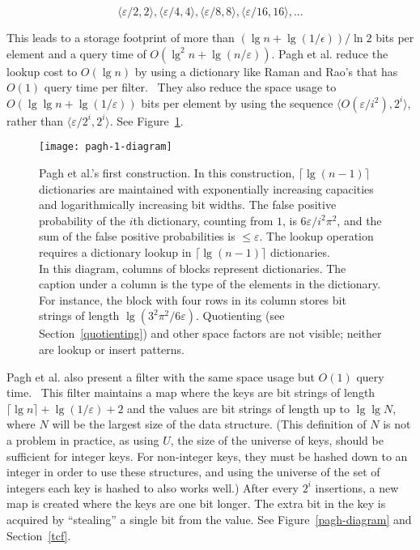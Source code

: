 \documentclass[letterpaper,twocolumn,10pt]{article}
\newcommand{\etal}{et al.}
\begin{document}
\[
\langle \varepsilon / 2, 2 \rangle,
 \langle \varepsilon / 4, 4 \rangle,
 \langle \varepsilon / 8, 8 \rangle,
 \langle \varepsilon / 16, 16 \rangle,
 \ldots
\]

This leads to a storage footprint of more than $(\lg n + \lg (1/\epsilon)) / \ln 2$ bits per element and a query time of $O(\lg^2 n + \lg (n/\varepsilon))$.
Pagh \etal{} reduce the lookup cost to $O(\lg n)$ by using a dictionary like Raman and Rao's that has $O(1)$ query time per filter.~\cite{psw,succinct}
They also reduce the space usage to $O(\lg \lg n + \lg (1/\varepsilon))$ bits per element by using the sequence $\langle O(\varepsilon / i^2),  2^i \rangle$, rather than  $\langle \varepsilon / 2^i,  2^i \rangle$.
See Figure~\ref{pagh-1-diagram}.

\begin{figure}
\texttt{[image: pagh-1-diagram]}
\caption{\label{pagh-1-diagram}
Pagh \etal{}'s first construction.
In this construction, $\lceil\lg (n-1) \rceil$ dictionaries are maintained with exponentially increasing capacities and logarithmically increasing bit widths.
The false positive probability of the $i$th dictionary, counting from $1$, is $6 \varepsilon / i^2 \pi^2$, and the sum of the false positive probabilities is $\le \varepsilon$.
The lookup operation requires a dictionary lookup in $\lceil\lg(n-1)\rceil$ dictionaries.\\
In this diagram, columns of blocks represent dictionaries.
The caption under a column is the type of the elements in the dictionary. For instance, the block with four rows in its column stores bit strings of length $\lg (3^2 \pi^2 / 6 \varepsilon)$.
Quotienting (see Section~\ref{quotienting}) and other space factors are not visible; neither are lookup or insert patterns.
}
\end{figure}

Pagh \etal{} also present a filter with the same space usage but $O(1)$ query time.~\cite{psw}
This filter maintains a map where the keys are bit strings of length $\lceil \lg n \rceil + \lg (1/\varepsilon) + 2$ and the values are bit strings of length up to $\lg \lg N$, where $N$ will be the largest size of the data structure.
(This definition of $N$ is not a problem in practice, as using $U$, the size of the universe of keys, should be sufficient for integer keys. For non-integer keys, they must be hashed down to an integer in order to use these structures, and using the universe of the set of integers each key is hashed to also works well.)
After every $2^i$ insertions, a new map is created where the keys are one bit longer.
The extra bit in the key is acquired by ``stealing'' a single bit from the value.
See Figure~\ref{pagh-diagram} and Section~\ref{tcf}.
\end{document}
